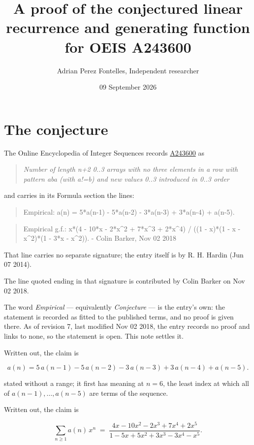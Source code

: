 \documentclass[11pt]{article}
\title{A proof of the conjectured linear recurrence and generating function for OEIS A243600}
\author{Adrian Perez Fontelles, Independent researcher}
\date{09 September 2026}
\theoremstyle{definition}
\begin{document}
\maketitle
\section{The conjecture}

The Online Encyclopedia of Integer Sequences records \href{https://oeis.org/A243600}{A243600} as

\begin{quote}\itshape Number of length n+2 0..3 arrays with no three elements in a row with pattern aba (with a!=b) and new values 0..3 introduced in 0..3 order\end{quote}

and carries in its Formula section the lines:

\begin{quote}\ttfamily Empirical: a(n) = 5*a(n-1) - 5*a(n-2) - 3*a(n-3) + 3*a(n-4) + a(n-5).\end{quote}

\begin{quote}\ttfamily Empirical g.f.: x*(4 - 10*x - 2*x\textasciicircum{}2 + 7*x\textasciicircum{}3 + 2*x\textasciicircum{}4) / ((1 - x)*(1 - x - x\textasciicircum{}2)*(1 - 3*x - x\textasciicircum{}2)). - Colin Barker, Nov 02 2018\end{quote}

That line carries no separate signature; the entry itself is by R. H. Hardin (Jun 07 2014).

The line quoted ending in that signature is contributed by Colin Barker on Nov 02 2018.

The word {\itshape Empirical} --- equivalently {\itshape Conjecture} --- is the entry's own: the statement is recorded as fitted to the published terms, and no proof is given there. As of revision 7, last modified Nov 02 2018, the entry records no proof and links to none, so the statement is open. This note settles it.

Written out, the claim is

\[a(n) = 5\,a(n-1) - 5\,a(n-2) - 3\,a(n-3) + 3\,a(n-4) + a(n-5).\]

stated without a range; it first has meaning at $n = 6$, the least index at which all of $a(n-1),\dots,a(n-5)$ are terms of the sequence.

Written out, the claim is

\[\sum_{n \ge 1} a(n)\,x^n \;=\; \frac{4x - 10x^{2} - 2x^{3} + 7x^{4} + 2x^{5}}{1 - 5x + 5x^{2} + 3x^{3} - 3x^{4} - x^{5}}.\]
\end{document}
